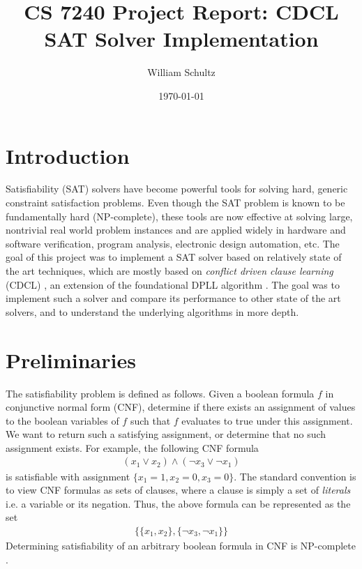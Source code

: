 \documentclass[12pt]{article}
\begin{document}
\title{CS 7240 Project Report: CDCL SAT Solver Implementation}
\author{William Schultz}
\date{\today}

\maketitle

\newcommand{\green}[1]{\textcolor{green}{#1}}
\newcommand{\red}[1]{\textcolor{red}{#1}}

\section{Introduction}

Satisfiability (SAT) solvers have become powerful tools for solving hard, generic constraint satisfaction problems. Even though the SAT problem is known to be fundamentally hard (NP-complete), these tools are now effective at solving large, nontrivial real world problem instances and are applied widely in hardware and software verification, program analysis, electronic design automation, etc. The goal of this project was to implement a SAT solver based on relatively state of the art techniques, which are mostly based on \textit{conflict driven clause learning} (CDCL) \cite{09bieresathandbook, bierecdcl,96sakallah}, an extension of the foundational DPLL algorithm \cite{1960dpll}. The goal was to implement such a solver and compare its performance to other state of the art solvers, and to understand the underlying algorithms in more depth.

\section{Preliminaries}

The satisfiability problem is defined as follows. Given a boolean formula $f$ in conjunctive normal form (CNF), determine if there exists an assignment of values to the boolean variables of $f$ such that $f$ evaluates to true under this assignment. We want to return such a satisfying assignment, or determine that no such assignment exists. For example, the following CNF formula
\begin{align*}
    (x_1 \vee x_2) \wedge (\neg x_3 \vee \neg x_1)
\end{align*}
is satisfiable with assignment $\{x_1=1, x_2=0, x_3=0\}$. The standard convention is to view CNF formulas as sets of clauses, where a clause is simply a set of \textit{literals} i.e. a variable or its negation. Thus, the above formula can be represented as the set
\begin{align*}
    \{\{x_1,x_2\}, \{\neg x_3, \neg x_1\}\}
\end{align*}
Determining satisfiability of an arbitrary boolean formula in CNF is NP-complete \cite{71cook}.
\end{document}
